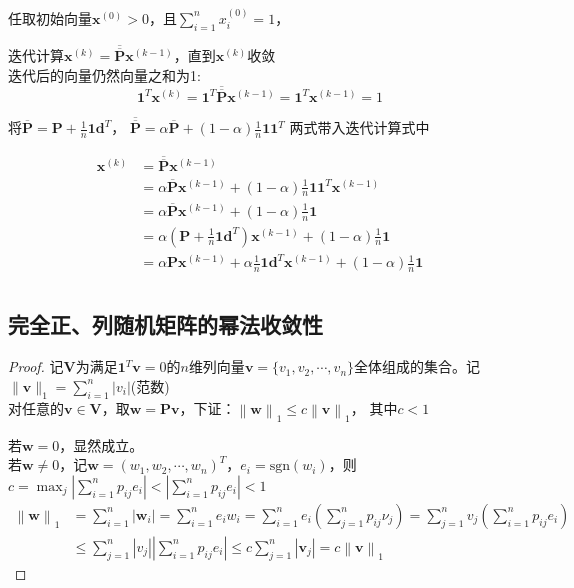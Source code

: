 \documentclass[12pt, a4paper, oneside]{ctexbook}
\begin{document}
任取初始向量$\mathbf{x}^{(0)}>0$，且$\sum\limits_{i=1}^nx_i^{(0)}=1$，

迭代计算$\mathbf{x}^{(k)}=\overline{\overline{\mathbf{P}}}\mathbf{x}^{(k-1)}$，直到$\mathbf{x}^{(k)}$收敛\\
迭代后的向量仍然向量之和为1:
$$\mathbf{1}^T\mathbf{x}^{(k)}=\mathbf{1}^T\overline{\overline{\mathbf{P}}}\mathbf{x}^{(k-1)}=\mathbf{1}^T\mathbf{x}^{(k-1)}=1$$

将$\overline{\mathbf{P}}=\mathbf{P}+\frac{1}{n}\mathbf{1}\mathbf{d}^T$， $\overline{\overline{\mathbf{P}}}=\alpha\overline{\mathbf{P}}+(1-\alpha)\frac{1}{n}\mathbf{1}\mathbf{1}^T$
两式带入迭代计算式中

$$\begin{aligned}
    \mathbf{x}^{(k)}&=\overline{\overline{\mathbf{P}}}\mathbf{x}^{(k-1)}\\
    &=\alpha\overline{\mathbf{P}}\mathbf{x}^{(k-1)}+(1-\alpha)\frac{1}{n}\mathbf{1}\mathbf{1}^T\mathbf{x}^{(k-1)}\\
    &=\alpha\overline{\mathbf{P}}\mathbf{x}^{(k-1)}+(1-\alpha)\frac{1}{n}\mathbf{1}\\
    &=\alpha(\mathbf{P}+\frac{1}{n}\mathbf{1}\mathbf{d}^T)\mathbf{x}^{(k-1)}+(1-\alpha)\frac{1}{n}\mathbf{1}\\
    &=\alpha\mathbf{P}\mathbf{x}^{(k-1)}+\alpha\frac{1}{n}\mathbf{1}\mathbf{d}^T\mathbf{x}^{(k-1)}+(1-\alpha)\frac{1}{n}\mathbf{1}\\
\end{aligned}$$

\subsection{完全正、列随机矩阵的幂法收敛性}
\begin{proof}
    记$\mathbf{V}$为满足$\mathbf{1}^T\mathbf{v}= 0 $的$n$维列向量$\mathbf{v}=\{v_1,v_2,\cdots,v_n\}$全体组成的集合。记$\|\mathbf{v}\|_1=\sum\limits_{i=1}^n|v_i|$(范数)\\
    对任意的$\mathbf{v}\in\mathbf{V}$，取$\mathbf{w}=\mathbf{P}\mathbf{v}$，下证：$\left\|\mathbf{w}\right\|_1\leq c\left\|\mathbf{v}\right\|_1$， 其中$c<1$

    \noindent 若$\mathbf{w}=0$，显然成立。\\
    若$\mathbf{w}\neq0$，记$\mathbf{w}=(w_1,w_2,\cdots,w_n)^T$，$e_i = \text{sgn}(w_i)$，则 $c=\max_{j}\left|\sum_{i=1}^{n}p_{ij}e_{i}\right|<\left|\sum_{i=1}^np_{ij}e_{i}\right|<1$ 
    $$\begin{aligned}
        \left\|\mathbf{w}\right\|_1
        &=\sum_{i=1}^n\left|\mathbf{w}_i\right|=\sum_{i=1}^ne_iw_i=\sum_{i=1}^ne_i\left(\sum_{j=1}^np_{ij}\nu_j\right)=\sum_{j=1}^nv_j\left(\sum_{i=1}^np_{ij}e_i\right)\\
        &\leq\sum_{j=1}^n\left|v_j\right|\left|\sum_{i=1}^np_{ij}e_i\right|\leq c\sum_{j=1}^n\left|\mathbf{v}_j\right|=c\left\|\mathbf{v}\right\|_1
    \end{aligned}$$
\end{proof}
\end{document}
